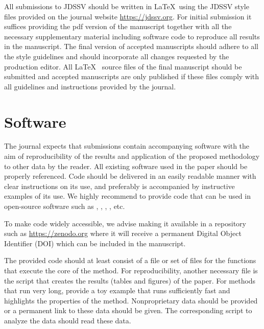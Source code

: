 \documentclass[
]{jdssv}
\begin{document}
All submissions to JDSSV should be written in \LaTeX~using the JDSSV
style files provided on the journal website \url{https://jdssv.org}. For
initial submission it suffices providing the pdf version of the
manuscript together with all the necessary supplementary material
including software code to reproduce all results in the manuscript. The
final version of accepted manuscripts should adhere to all the style
guidelines and should incorporate all changes requested by the
production editor. All \LaTeX~ source files of the final manuscript
should be submitted and accepted manuscripts are only published if these
files comply with all guidelines and instructions provided by the
journal.

\hypertarget{software}{%
\section{Software}\label{software}}

The journal expects that submissions contain accompanying software with
the aim of reproducibility of the results and application of the
proposed methodology to other data by the reader. All existing software
used in the paper should be properly referenced. Code should be
delivered in an easily readable manner with clear instructions on its
use, and preferably is accompanied by instructive examples of its use.
We highly recommend to provide code that can be used in open-source
software such as  \citep{R}, 
\citep{python},  \citep{Julia}, 
\citep{octave}, etc.

To make code widely accessible, we advise making it available in a
repository such as \url{https://zenodo.org} where it will receive a
permanent Digital Object Identifier (DOI) which can be included in the
manuscript.

The provided code should at least consist of a file or set of files for
the functions that execute the core of the method. For reproducibility,
another necessary file is the script that creates the results (tables
and figures) of the paper. For methods that run very long, provide a toy
example that runs sufficiently fast and highlights the properties of the
method. Nonproprietary data should be provided or a permanent link to
these data should be given. The corresponding script to analyze the data
should read these data.
\end{document}
